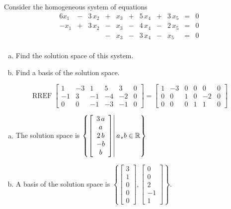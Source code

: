
\begin{exerciseStatement}


Consider the homogeneous system of equations 
\begin{alignat*}{6} x_{1} &-& 3 \, x_{2} &+& x_{3} &+& 5 \, x_{4} &+& 3 \, x_{5} &=& 0 \\-x_{1} &+& 3 \, x_{2} &-& x_{3} &-& 4 \, x_{4} &-& 2 \, x_{5} &=& 0 \\ & &  &-& x_{3} &-& 3 \, x_{4} &-& x_{5} &=& 0 \\ \end{alignat*}
            


\begin{enumerate}[(a)]
\item  Find the solution space of this system.
\item  Find a basis of the solution space.
\end{enumerate}
    
\end{exerciseStatement}
    
\begin{exerciseAnswer} 


\[\operatorname{RREF} \left[\begin{array}{ccccc|c}
1 & -3 & 1 & 5 & 3 & 0 \\
-1 & 3 & -1 & -4 & -2 & 0 \\
0 & 0 & -1 & -3 & -1 & 0
\end{array}\right] = \left[\begin{array}{ccccc|c}
1 & -3 & 0 & 0 & 0 & 0 \\
0 & 0 & 1 & 0 & -2 & 0 \\
0 & 0 & 0 & 1 & 1 & 0
\end{array}\right] \]


\begin{enumerate}[(a)]
\item The solution space is \( \left\{ \left[\begin{array}{c}
3 \, a \\
a \\
2 \, b \\
-b \\
b
\end{array}\right] \middle|\,a\text{\texttt{,}}b\in\mathbb{R}\right\} \)
\item A basis of the solution space is \( \left\{ \left[\begin{array}{c}
3 \\
1 \\
0 \\
0 \\
0
\end{array}\right] , \left[\begin{array}{c}
0 \\
0 \\
2 \\
-1 \\
1
\end{array}\right] \right\} \).
\end{enumerate}
    
\end{exerciseAnswer}
    
